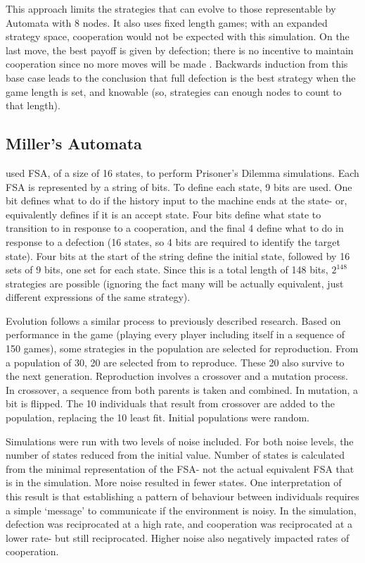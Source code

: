 \documentclass[a4paper,11pt,bcshonoursthesis,singlespace,oneside,thesisdraft,pdflatex]{cssethesis}
\begin{document}
This approach limits the strategies that can evolve to those representable by Automata with 8 nodes. 
It also uses fixed length games; with an expanded strategy space, cooperation would not be expected with this simulation. 
On the last move, the best payoff is given by defection; there is no incentive to maintain cooperation since no more moves will be made \citep{aumann1995backward}. Backwards induction from this base case leads to the conclusion that full defection is the best strategy when the game length is set, and knowable (so, strategies can enough nodes to count to that length). 
\subsection{Miller's Automata}
\citet{miller1996coevolution} used FSA, of a size of 16 states, to perform Prisoner's Dilemma simulations.  
Each FSA is represented by a string of bits. 
To define each state, 9 bits are used. One bit defines what to do if the history input to the machine ends at the state- or, equivalently defines if it is an accept state. Four bits define what state to transition to in response to a cooperation, and the final 4 define what to do in response to a defection (16 states, so 4 bits are required to identify the target state). 
Four bits at the start of the string define the initial state, followed by 16 sets of 9 bits, one set for each state. 
Since this is a total length of 148 bits, $2^{148}$ strategies are possible (ignoring the fact many will be actually equivalent, just different expressions of the same strategy). 

Evolution follows a similar process to previously described research. 
Based on performance in the game (playing every player including itself in a sequence of 150 games), some strategies in the population are selected for reproduction. 
From a population of 30, 20 are selected from to reproduce. 
These 20 also survive to the next generation. 
Reproduction involves a crossover and a mutation process. 
In crossover, a sequence from both parents is taken and combined. 
In mutation, a bit is flipped. 
The 10 individuals that result from crossover are added to the population, replacing the 10 least fit. 
Initial populations were random. 

Simulations were run with two levels of noise included.  
For both noise levels, the number of states reduced from the initial value. 
Number of states is calculated from the minimal representation of the FSA- not the actual equivalent FSA that is in the simulation. 
More noise resulted in fewer states. 
One interpretation of this result is that establishing a pattern of behaviour between individuals requires a simple `message' to communicate if the environment is noisy. 
In the simulation, defection was reciprocated at a high rate, and cooperation was reciprocated at a lower rate- but still reciprocated. 
Higher noise also negatively impacted rates of cooperation. 
\end{document}
